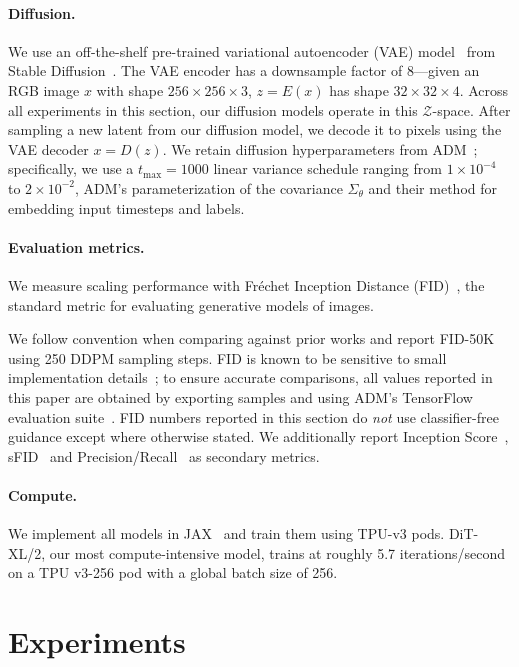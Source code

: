 \documentclass[10pt,twocolumn,letterpaper]{article}
\begin{document}
\paragraph{Diffusion.} We use an off-the-shelf pre-trained variational autoencoder (VAE) model~\cite{kingma2013auto} from Stable Diffusion~\cite{rombach2021highresolution}. The VAE encoder has a downsample factor of 8---given an RGB image $x$ with shape $256 \times 256 \times 3$, $z = E(x)$ has shape $32 \times 32 \times 4$. Across all experiments in this section, our diffusion models operate in this $\mathcal{Z}$-space. After sampling a new latent from our diffusion model, we decode it to pixels using the VAE decoder $x = D(z)$. We retain diffusion hyperparameters from ADM~\cite{dhariwal2021adm}; specifically, we use a $t_\text{max}=1000$ linear variance schedule ranging from $1 \times 10^{-4}$ to $2 \times 10^{-2}$, ADM's parameterization of the covariance $\Sigma_\theta$ and their method for embedding input timesteps and labels.
\vspace{-6mm}
\paragraph{Evaluation metrics.} We measure scaling performance with Fréchet Inception Distance (FID)~\cite{heusel2017gans}, the standard metric for evaluating generative models of images. 

\noindent We follow convention when comparing against prior works and report FID-50K using 250 DDPM sampling steps. FID is known to be sensitive to small implementation details~\cite{parmar2021cleanfid}; to ensure accurate comparisons, all values reported in this paper are obtained by exporting samples and using ADM's TensorFlow evaluation suite~\cite{dhariwal2021adm}. FID numbers reported in this section do \textit{not} use classifier-free guidance except where otherwise stated. We additionally report Inception Score~\cite{salimans2016gans}, sFID~\cite{nash2021generating} and Precision/Recall~\cite{kynkaanniemi2019improved} as secondary metrics.
\paragraph{Compute.} We implement all models in JAX~\cite{jax2018github} and train them using TPU-v3 pods. DiT-XL/2, our most compute-intensive model, trains at roughly 5.7 iterations/second on a TPU v3-256 pod with a global batch size of 256. 

\section{Experiments}\label{sec:experiments}
\end{document}
